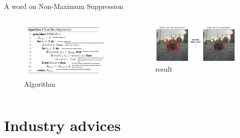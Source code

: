 \documentclass{beamer}
\begin{document}
\begin{frame}{A word on Non-Maximum Suppression}
	\begin{columns}
		\begin{column}{0.6\textwidth}
			\begin{figure}
				\centering
				\includegraphics[width=\textwidth]{images/nms_algo.png}
				\caption{Algorithm}
			\end{figure}
		\end{column}
		\begin{column}{0.4\textwidth}
			\begin{figure}
				\centering
				\includegraphics[width=\textwidth]{images/nms.png}
				\caption{result}
			\end{figure}
		\end{column}
	\end{columns}
\end{frame}

\part{Industry advices}
\begin{frame}
	\partpage
\end{frame}
\end{document}
